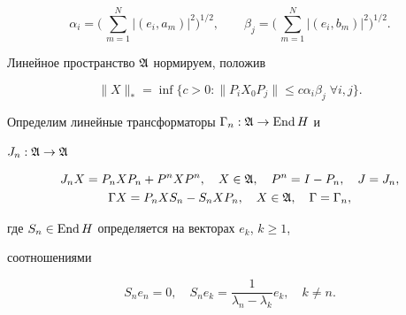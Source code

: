 \begin{equation}


\alpha_i=\biggl(\,\sum^N_{m=1}|(e_i,a_m)|^2\biggr)^{1/2},\qquad


\beta_j=\biggl(\,\sum^N_{m=1}|(e_i,b_m)|^2\biggr)^{1/2}.


\end{equation}


Линейное пространство $\frak A$ нормируем, положив


\begin{equation}


\|X\|_*=\inf\{c>0:\|P_iX_0P_j\|\le c\alpha_i\beta_j \;


\forall i,j\}.


\end{equation}





Определим линейные трансформаторы $\Gamma_n:\frak A\to\operatorname{End} H$ и


$J_n:\frak A\to\frak A$


\begin{gather}


J_nX=P_nXP_n+P^nXP^n,\quad X\in\frak A,\quad


P^n=I-P_n,\quad J=J_n,\\


\Gamma X=P_nXS_n-S_nXP_n,\quad X\in\frak A,\quad \Gamma=\Gamma_n,


\end{gather}


где $S_n\in\operatorname{End} H$ определяется на векторах $e_k$, $k\ge 1$,


соотношениями


\begin{equation}


S_ne_n=0,\quad S_ne_k=


\frac{1}{\lambda_n-\lambda_k}e_k,\quad k\ne n.


\end{equation}





